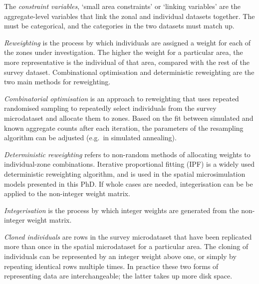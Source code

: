 The \emph{constraint variables}, `small area constraints' or `linking
variables' are the aggregate-level variables that link the zonal and individual
datasets together. The must be categorical, and the categories in the two
datasets must match up.

\emph{Reweighting} is the process by which individuals are assigned a weight
for each of the zones under investigation. The higher the weight for a
particular area, the more representative is the individual of that area,
compared with the rest of the survey dataset. Combinational optimisation and
deterministic reweighting are the two main methods for reweighting.

\emph{Combinatorial optimisation}  is an
approach to reweighting that uses repeated randomised sampling to
repeatedly select individuals from the survey microdataset and allocate them to
zones. Based on the fit between simulated and known aggregate counts after each
iteration, the parameters of the resampling algorithm can be adjusted (e.g.~in
simulated annealing).

\emph{Deterministic reweighting} refers to non-random methods of allocating
weights to individual-zone combinations. Iterative proportional fitting (IPF)
is a widely used deterministic reweighting algorithm, and is used in the
spatial microsimulation models presented in this PhD. If whole cases are
needed, integerisation can be be applied to the non-integer weight matrix.

\emph{Integerisation} is the process by which integer weights are generated
from the non-integer weight matrix. 

\emph{Cloned individuals}  are rows in the survey microdataset
that have been replicated more than once in the spatial microdataset for a
particular area. The cloning of individuals can be represented by an integer
weight above one, or simply by repeating identical rows multiple times. In
practice these two forms of representing data are interchangeable; the latter
takes up more disk space.


